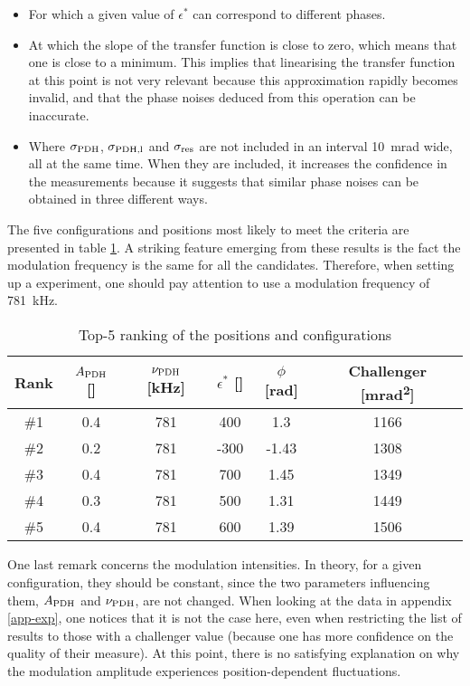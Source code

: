 \begin{itemize}
	\item For which a given value of $\epsilon^*$ can correspond to different phases.
	\item At which the slope of the transfer function is close to zero, which means that one is close to a minimum. This implies that linearising the transfer function at this point is not very relevant because this approximation rapidly becomes invalid, and that the phase noises deduced from this operation can be inaccurate.
	\item Where $\sigma_{\text{PDH}}$,  $\sigma_{\text{PDH,l}}$ and $\sigma_{\text{res}}$ are not included in an interval \SI{10}{\milli\radian} wide, all at the same time. When they are included, it increases the confidence in the measurements because it suggests that similar phase noises can be obtained in three different ways.
\end{itemize}

The five configurations and positions most likely to meet the criteria are presented in table \ref{ranking}. A striking feature emerging from these results is the fact the \pdh modulation frequency is the same for all the candidates. Therefore, when setting up a \rcer experiment, one should pay attention to use a \pdh modulation frequency of \SI{781}{\kilo\hertz}.

\begin{table}[h]
	\centering
	\begin{tabular}{|c|c|c|c|c|c|}
		\hline
		Rank & $A_{\text{PDH}}$ [\si{\voltptp}] & $\nu_{\text{PDH}}$ [\si{\kilo\hertz}] & $\epsilon^*$ [\si{\au}] & $\phi$ [\si{\radian}] & Challenger [\si{\milli\radian\squared}]\\
		\hline
		\hline
		\#1 & 0.4 & 781 & 400 & 1.3 & 1166\\
		\#2 & 0.2 & 781 & -300 & -1.43 & 1308\\
		\#3 & 0.4 & 781 & 700 & 1.45 & 1349\\
		\#4 & 0.3 & 781 & 500 & 1.31 & 1449\\
		\#5 & 0.4 & 781 & 600 & 1.39 & 1506\\
		\hline
	\end{tabular}
	\caption{Top-5 ranking of the positions and configurations}
	\label{ranking}
\end{table}

One last remark concerns the modulation intensities. In theory, for a given configuration, they should be constant, since the two parameters influencing them, $A_{\text{PDH}}$ and $\nu_{\text{PDH}}$, are not changed. When looking at the data in appendix \ref{app-exp}, one notices that it is not the case here, even when restricting the list of results to those with a challenger value (because one has more confidence on the quality of their measure). At this point, there is no satisfying explanation on why the modulation amplitude experiences position-dependent fluctuations.